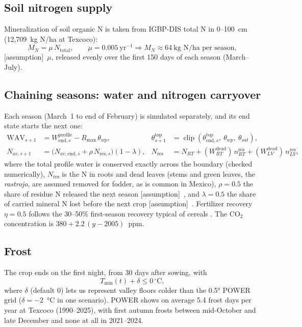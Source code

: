 \documentclass[11pt,a4paper]{article}
\newcommand{\assumption}[1]{\textcolor{orange!70!black}{[assumption]}~#1}
\begin{document}
\subsection{Soil nitrogen supply}
Mineralization of soil organic N is taken from IGBP-DIS total N in 0--100~cm (12{,}709~kg N/ha at Texcoco):
\begin{equation}
  M_N = \mu\,N_{\mathrm{total}},\qquad \mu = 0.005~\text{yr}^{-1} \Rightarrow M_N \approx 64~\text{kg N/ha per season},
\end{equation}
\assumption{\(\mu\)}, released evenly over the first 150 days of each season (March--July).

\subsection{Chaining seasons: water and nitrogen carryover}
Each season (March~1 to end of February) is simulated separately, and its end state starts the next one:
\begin{align}
  \mathrm{WAV}_{s+1} &= W^{\mathrm{profile}}_{\mathrm{end},s} - R_{\max}\,\theta_{wp}, &
  \theta^{\mathrm{top}}_{s+1} &= \operatorname{clip}(\theta^{\mathrm{top}}_{\mathrm{end},s},\ \theta_{wp},\ \theta_{sat}),\\
  N_{av,s+1} &= \big(N_{av,\mathrm{end},s} + \rho\,N_{\mathrm{res},s}\big)(1 - \lambda), &
  N_{\mathrm{res}} &= N_{RT} + (W_{RT}^{\mathrm{dead}})\,n^{\mathrm{res}}_{RT} + (W_{LV}^{\mathrm{dead}})\,n^{\mathrm{res}}_{LV},
\end{align}
where the total profile water is conserved exactly across the boundary (checked numerically), \(N_{\mathrm{res}}\) is
the N in roots and dead leaves (stems and green leaves, the \emph{rastrojo}, are assumed removed for fodder, as is
common in Mexico), \(\rho = 0.5\) the share of residue N released the next season \assumption{}, and
\(\lambda = 0.5\) the share of carried mineral N lost before the next crop \assumption{}. Fertilizer recovery
\(\eta = 0.5\) follows the 30--50\% first-season recovery typical of cereals \citep{cassman2002nue}. The CO\(_2\)
concentration is \(380 + 2.2\,(y - 2005)\)~ppm.

\subsection{Frost}
The crop ends on the first night, from 30 days after sowing, with
\begin{equation}
  T_{\min}(t) + \delta \le 0\,^{\circ}\mathrm{C},
\end{equation}
where \(\delta\) (default 0) lets us represent valley floors colder than the 0.5° POWER grid (\(\delta = -2\)~°C in
one scenario). POWER shows on average 5.4 frost days per year at Texcoco (1990--2025), with first autumn frosts
between mid-October and late December and none at all in 2021--2024.
\end{document}
